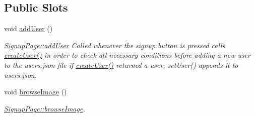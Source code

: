 \subsection*{Public Slots}
\begin{DoxyCompactItemize}
\item 
\mbox{\label{classSignupPage_a9b2f3559ecf002b3a35c73348e0d7e81}} 
void \hyperlink{classSignupPage_a9b2f3559ecf002b3a35c73348e0d7e81}{add\+User} ()
\begin{DoxyCompactList}\small\item\em \hyperlink{classSignupPage_a9b2f3559ecf002b3a35c73348e0d7e81}{Signup\+Page\+::add\+User} Called whenever the signup button is pressed calls \hyperlink{classSignupPage_ac6f433285ca77bcfa6bae1d3b37cd5b5}{create\+User()} in order to check all necessary conditions before adding a new user to the users.\+json file if \hyperlink{classSignupPage_ac6f433285ca77bcfa6bae1d3b37cd5b5}{create\+User()} returned a user, set\+User() appends it to users.\+json. \end{DoxyCompactList}\item 
void \hyperlink{classSignupPage_a53027011ed8c2cf3e098468269bee0db}{browse\+Image} ()
\begin{DoxyCompactList}\small\item\em \hyperlink{classSignupPage_a53027011ed8c2cf3e098468269bee0db}{Signup\+Page\+::browse\+Image}. \end{DoxyCompactList}\end{DoxyCompactItemize}
